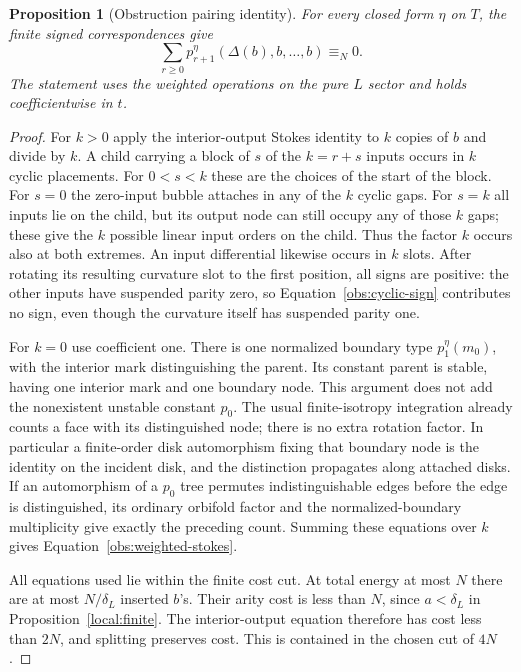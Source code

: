 \documentclass[11pt]{article}
\newtheorem{proposition}[theorem]{Proposition}
\theoremstyle{definition}
\theoremstyle{remark}
\numberwithin{equation}{section}
\begin{document}
\begin{proposition}[Obstruction pairing identity]
\label{obs:pairing-identity}
For every closed form $\eta$ on $T$, the finite signed
correspondences give
\begin{equation}
 \label{obs:weighted-stokes}
 \sum_{r\ge0}p_{r+1}^\eta(\Delta(b),b,\ldots,b)\equiv_N0.
\end{equation}
The statement uses the weighted operations on the pure $L$
sector and holds coefficientwise in $t$.
\end{proposition}

\begin{proof}
For $k>0$ apply the interior-output Stokes identity to $k$
copies of $b$ and divide by $k$.  A child carrying a block of
$s$ of the $k=r+s$ inputs occurs in $k$ cyclic placements.
For $0<s<k$ these are the choices of the start of the block.
For $s=0$ the zero-input bubble attaches in any of the $k$
cyclic gaps.  For $s=k$ all inputs lie on the child, but its
output node can still occupy any of those $k$ gaps; these give
the $k$ possible linear input orders on the child.  Thus the
factor $k$ occurs also at both extremes.  An input differential
likewise occurs in $k$ slots.  After rotating its resulting
curvature slot to the first position, all signs are positive:
the other inputs have suspended parity zero, so
Equation~\eqref{obs:cyclic-sign} contributes no sign, even
though the curvature itself has suspended parity one.

For $k=0$ use coefficient one.  There is one normalized
boundary type $p_1^\eta(m_0)$, with the interior mark
distinguishing the parent.  Its constant parent is stable,
having one interior mark and one boundary node.  This argument
does not add the nonexistent unstable constant $p_0$.
The usual finite-isotropy integration already counts a face
with its distinguished node; there is no extra rotation
factor.  In particular a finite-order disk automorphism
fixing that boundary node is the identity on the incident
disk, and the distinction propagates along attached disks.
If an automorphism of a $p_0$ tree permutes indistinguishable
edges before the edge is distinguished, its ordinary orbifold
factor and the normalized-boundary multiplicity give exactly
the preceding count.  Summing these equations over $k$ gives
Equation~\eqref{obs:weighted-stokes}.

All equations used lie within the finite cost cut.  At total
energy at most $N$ there are at most $N/\delta_L$ inserted
$b$'s.  Their arity cost is less than $N$, since
$a<\delta_L$ in Proposition~\ref{local:finite}.  The
interior-output equation therefore has cost less than $2N$,
and splitting preserves cost.  This is contained in the
chosen cut of $4N$.
\end{proof}
\end{document}
